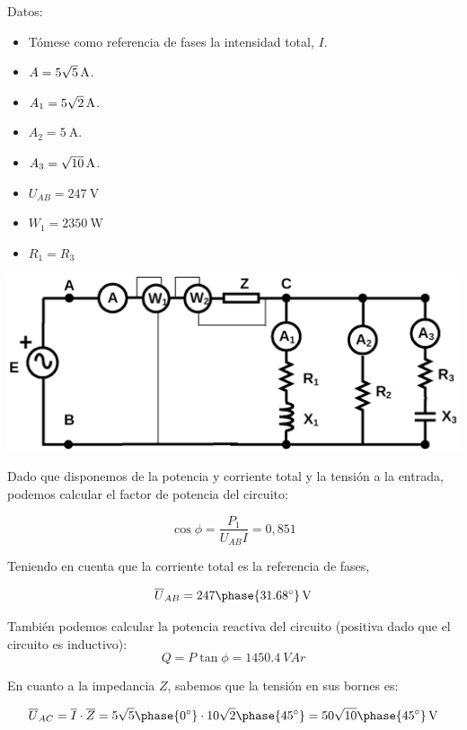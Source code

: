 \documentclass[12pt]{article}
\begin{document}
\begin{enumerate}[resume]
Datos:
\begin{itemize}

\item Tómese como referencia de fases la intensidad total, $I$.
\item $A = \SI[parse-numbers = false]{5\sqrt{5}}{\ampere}$.
\item $A_1 = \SI[parse-numbers = false]{5\sqrt{2}}{\ampere}$.
\item $A_2 = \SI{5}{\ampere}$.
\item $A_3 = \SI[parse-numbers = false]{\sqrt{10}}{\ampere}$.
\item $U_{AB} = \SI{247}{\volt}$
\item $W_1 = \SI{2350}{\watt}$
\item $R_1 = R_3$

\end{itemize}

\begin{center}
  \includegraphics[height=0.2\textheight]{../figs/problema10}
\end{center}
Dado que disponemos de la potencia y corriente total y la tensión a
la entrada, podemos calcular el factor de potencia del circuito:

\[
\cos \phi = \frac{P_1}{U_{AB} I} = 0,851
\]

Teniendo en cuenta que la corriente total es la referencia de fases, 

\[
\overline{U}_{AB} = \SI[parse-numbers=false]{247 \phase{\ang{31.68}}}{\V}
\]

También podemos calcular la potencia reactiva del circuito
(positiva dado que el circuito es inductivo):
\[
Q = P \tan \phi = \SI{1450.4}{VA}r
\]


En cuanto a la impedancia $Z$, sabemos que la tensión en sus bornes
es:

\[
\overline{U}_{AC} = \overline{I} \cdot \overline{Z} =
5\sqrt{5}\phase{\ang{0}} \cdot 10\sqrt{2}\phase{\ang{45}} = \SI[parse-numbers=false]{50\sqrt{10}\phase{\ang{45}}}{\V}
\]


\end{enumerate}
\end{document}
